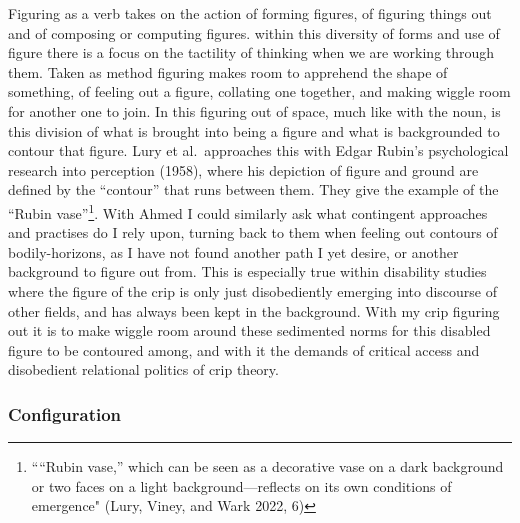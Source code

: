 Figuring as a verb takes on the action of forming figures, of figuring
things out and of composing or computing figures. within this diversity
of forms and use of figure there is a focus on the tactility of thinking
when we are working through them. Taken as method figuring makes room to
apprehend the shape of something, of feeling out a figure, collating one
together, and making wiggle room for another one to join. In this
figuring out of space, much like with the noun, is this division of what
is brought into being a figure and what is backgrounded to contour that
figure. Lury et al.~approaches this with Edgar Rubin's psychological
research into perception (1958), where his depiction of figure and
ground are defined by the ``contour'' that runs between them. They give
the example of the ``Rubin vase''\footnote{````Rubin vase,'' which can
  be seen as a decorative vase on a dark background or two faces on a
  light background---reflects on its own conditions of emergence" (Lury,
  Viney, and Wark 2022, 6)}. With Ahmed I could similarly ask what
contingent approaches and practises do I rely upon, turning back to them
when feeling out contours of bodily-horizons, as I have not found
another path I yet desire, or another background to figure out from.
This is especially true within disability studies where the figure of
the crip is only just disobediently emerging into discourse of other
fields, and has always been kept in the background. With my crip
figuring out it is to make wiggle room around these sedimented norms for
this disabled figure to be contoured among, and with it the demands of
critical access and disobedient relational politics of crip theory.

\hypertarget{configuration}{%
\subsubsection{Configuration}\label{configuration}}

